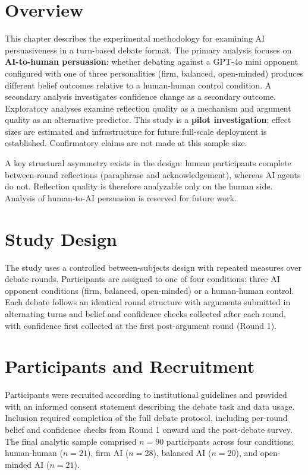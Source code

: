 \section{Overview}

This chapter describes the experimental methodology for examining AI persuasiveness
in a turn-based debate format. The primary analysis focuses on \textbf{AI-to-human
persuasion}: whether debating against a GPT-4o mini opponent configured with one of
three personalities (firm, balanced, open-minded) produces different belief outcomes
relative to a human-human control condition. A secondary analysis
investigates confidence change as a secondary outcome. Exploratory analyses examine
reflection quality as a mechanism and argument quality as an alternative predictor.
This study is a \textbf{pilot investigation}; effect sizes are estimated and
infrastructure for future full-scale deployment is established. Confirmatory claims
are not made at this sample size.

A key structural asymmetry exists in the design: human participants complete
between-round reflections (paraphrase and acknowledgement), whereas AI agents do not.
Reflection quality is therefore analyzable only on the human side. Analysis of
human-to-AI persuasion is reserved for future work.


\section{Study Design}

The study uses a controlled between-subjects design with repeated measures over
debate rounds. Participants are assigned to one of four conditions: three AI opponent
conditions (firm, balanced, open-minded) or a human-human control. Each debate
follows an identical round structure with arguments submitted in alternating turns
and belief and confidence checks collected after each round, with confidence first collected at
the first post-argument round (Round 1).


\section{Participants and Recruitment}

Participants were recruited according to institutional guidelines and provided with
an informed consent statement describing the debate task and data usage. Inclusion
required completion of the full debate protocol, including per-round belief and
confidence checks from Round 1 onward and the post-debate survey. The final analytic sample comprised
$n = 90$ participants across four conditions: human-human ($n = 21$), firm AI
($n = 28$), balanced AI ($n = 20$), and open-minded AI ($n = 21$).


